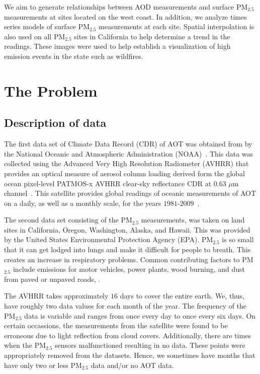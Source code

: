 \documentclass[10pt]{article}
\begin{document}
We aim to generate relationships between AOD measurements and surface PM$_{2.5}$ measurements at sites located on the west coast. In addition, we analyze times series models of surface PM$_{2.5}$ measurements at each site. Spatial interpolation is also used on all PM$_{2.5}$ sites in California to help determine a trend in the readings. These images were used to help establish a visualization of high emission events in the state such as wildfires.


\section{The Problem}





\subsection{Description of data}

The first data set of Climate Data Record (CDR) of AOT was obtained from by the National Oceanic and Atmospheric Administration (NOAA)~\cite{noaa}. This data was collected using the  Advanced Very High Resolution Radiometer (AVHRR) that provides an optical measure of aerosol column loading derived form the global ocean pixel-level PATMOS-x AVHRR clear-sky reflectance CDR at $0.63$ $\mu$m channel~\cite{noaa}. This satellite provides global readings of oceanic measurements of AOT on a daily, as well as a monthly scale, for the years $1981$-$2009$~\cite{noaa}.

The second data set consisting of the PM$_{2.5}$ measurements, was taken on land sites in California, Oregon, Washington, Alaska, and Hawaii. This was provided by the United States Environmental Protection Agency (EPA).   PM$_{2.5}$ is so small that it can get lodged into lungs and make it difficult for people to breath. This creates an increase in respiratory problems. Common contributing factors to PM$_{2.5}$ include emissions for motor vehicles, power plants, wood burning, and dust from paved or unpaved roads, \cite{epa}.

The AVHRR takes approximately $16$ days to cover the entire earth. We, thus, have roughly two data values for each month of the year. The frequency of the PM$_{2.5}$ data is variable and ranges from once every day to once every six days. On certain occassions, the measurements from the satellite were found to be  erroneous due to light reflection from cloud covers. Additionally, there are times when the PM$_{2.5}$ sensors malfunctioned resulting in no data. These points were appropriately removed from the datasets. Hence, we sometimes have months that have only two or less PM$_{2.5}$ data and/or no AOT data. 
\end{document}
